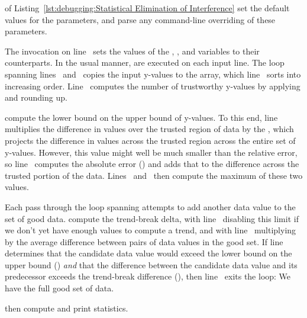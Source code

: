 \begin{fcvref}
 of
Listing~\ref{lst:debugging:Statistical Elimination of Interference}
set the default values for the parameters, and
 parse
any command-line overriding of these parameters.
\end{fcvref}
\begin{fcvref}
The  invocation on line~ sets the values of the
, , and  variables to their
 counterparts.
In the usual  manner,
 are executed on each input
line.
The loop spanning lines~ and~ copies
the input y-values to the
 array, which line~ sorts into increasing order.
Line~ computes the number of trustworthy y-values
by applying  and rounding up.

 compute the 
lower bound on the upper bound of y-values.
To this end, line~ multiplies the difference in values over
the trusted region of data by the , which projects the
difference in values across the trusted region across the entire
set of y-values.
However, this value might well be much smaller than the relative error,
so line~ computes the absolute error ()
and adds
that to the difference  across the trusted portion of the data.
Lines~ and~ then compute the maximum of
these two values.

Each pass through the loop spanning 
attempts to add another
data value to the set of good data.
 compute the trend-break delta,
with line~ disabling this
limit if we don't yet have enough values to compute a trend,
and with line~ multiplying  by the average
difference between pairs of data values in the good set.
If line~ determines that the candidate data value would exceed the
lower bound on the upper bound () \emph{and}
that the difference between the candidate data value
and its predecessor exceeds the trend-break difference (),
then line~ exits the loop: We have the full good set of data.

 then compute and print
statistics.
\end{fcvref}

